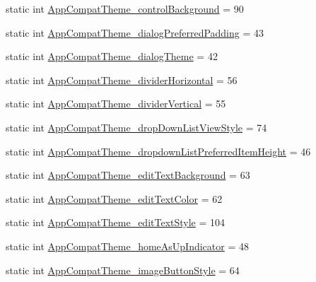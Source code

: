 \begin{DoxyCompactItemize}
static int \hyperlink{classandroid_1_1support_1_1v7_1_1cardview_1_1R_1_1styleable_aded076ba098cace6d5af80e46448b628}{App\+Compat\+Theme\+\_\+control\+Background} = 90
\item 
static int \hyperlink{classandroid_1_1support_1_1v7_1_1cardview_1_1R_1_1styleable_ae8501eb855f89c1202f5514c8347c99f}{App\+Compat\+Theme\+\_\+dialog\+Preferred\+Padding} = 43
\item 
static int \hyperlink{classandroid_1_1support_1_1v7_1_1cardview_1_1R_1_1styleable_a75ef082c5a516f8dbdbfe7ada1a403ec}{App\+Compat\+Theme\+\_\+dialog\+Theme} = 42
\item 
static int \hyperlink{classandroid_1_1support_1_1v7_1_1cardview_1_1R_1_1styleable_ab43c9135bab4d1f11e5da417725ca828}{App\+Compat\+Theme\+\_\+divider\+Horizontal} = 56
\item 
static int \hyperlink{classandroid_1_1support_1_1v7_1_1cardview_1_1R_1_1styleable_a0c1aaaa486728e1316ec4549d70827f9}{App\+Compat\+Theme\+\_\+divider\+Vertical} = 55
\item 
static int \hyperlink{classandroid_1_1support_1_1v7_1_1cardview_1_1R_1_1styleable_a9d95b8b96fc0c33fe2ccdbca4bb4c766}{App\+Compat\+Theme\+\_\+drop\+Down\+List\+View\+Style} = 74
\item 
static int \hyperlink{classandroid_1_1support_1_1v7_1_1cardview_1_1R_1_1styleable_afaa8a297c466030001f56355b8189813}{App\+Compat\+Theme\+\_\+dropdown\+List\+Preferred\+Item\+Height} = 46
\item 
static int \hyperlink{classandroid_1_1support_1_1v7_1_1cardview_1_1R_1_1styleable_a4aa486808b398010c0add74652864333}{App\+Compat\+Theme\+\_\+edit\+Text\+Background} = 63
\item 
static int \hyperlink{classandroid_1_1support_1_1v7_1_1cardview_1_1R_1_1styleable_ac460822fecf040d46fdef2df0935686e}{App\+Compat\+Theme\+\_\+edit\+Text\+Color} = 62
\item 
static int \hyperlink{classandroid_1_1support_1_1v7_1_1cardview_1_1R_1_1styleable_aa67cb5a7db3afa80cebeb9fad0404dff}{App\+Compat\+Theme\+\_\+edit\+Text\+Style} = 104
\item 
static int \hyperlink{classandroid_1_1support_1_1v7_1_1cardview_1_1R_1_1styleable_a2e70ceeae7e1d05bbc4fc942d0a8f7c5}{App\+Compat\+Theme\+\_\+home\+As\+Up\+Indicator} = 48
\item 
static int \hyperlink{classandroid_1_1support_1_1v7_1_1cardview_1_1R_1_1styleable_a72b5ca7a1aac1855262c99759b66331b}{App\+Compat\+Theme\+\_\+image\+Button\+Style} = 64
\item 

\end{DoxyCompactItemize}
